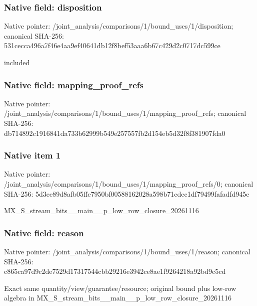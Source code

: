 \documentclass[10pt,a4paper]{article}
\begin{document}
\subsubsection{Native field: disposition}
Native pointer: /joint\_\allowbreak{}analysis/comparisons/1/bound\_\allowbreak{}uses/1/disposition; canonical SHA-256: 531cecca496a7f46e4aa9ef40641db12f8bef53aaa6b67c429d2c0717dc599ce

\begingroup\raggedright\sloppy included\par\endgroup

\subsubsection{Native field: mapping\_\allowbreak{}proof\_\allowbreak{}refs}
Native pointer: /joint\_\allowbreak{}analysis/comparisons/1/bound\_\allowbreak{}uses/1/mapping\_\allowbreak{}proof\_\allowbreak{}refs; canonical SHA-256: db714892c1916841da733b62999b549e257557fb2d154eb5d32f8f381907fda0

\subsubsection{Native item 1}
Native pointer: /joint\_\allowbreak{}analysis/comparisons/1/bound\_\allowbreak{}uses/1/mapping\_\allowbreak{}proof\_\allowbreak{}refs/0; canonical SHA-256: 5d3ee89d8afb05ffe7950bf00588162028a598b71cdec1df79499fafadfd945e

\begingroup\raggedright\sloppy MX\_\allowbreak{}S\_\allowbreak{}stream\_\allowbreak{}bits\_\allowbreak{}\_\allowbreak{}main\_\allowbreak{}\_\allowbreak{}p\_\allowbreak{}low\_\allowbreak{}row\_\allowbreak{}closure\_\allowbreak{}20261116\par\endgroup

\subsubsection{Native field: reason}
Native pointer: /joint\_\allowbreak{}analysis/comparisons/1/bound\_\allowbreak{}uses/1/reason; canonical SHA-256: c865ca97d9c2de7529d17317544cbb29216e3942ce8ae1f9264218a92bd9c5cd

\begingroup\raggedright\sloppy Exact same quantity/\allowbreak{}view/\allowbreak{}guarantee/\allowbreak{}resource;\allowbreak{} original bound plus low-row algebra in MX\_\allowbreak{}S\_\allowbreak{}stream\_\allowbreak{}bits\_\allowbreak{}\_\allowbreak{}main\_\allowbreak{}\_\allowbreak{}p\_\allowbreak{}low\_\allowbreak{}row\_\allowbreak{}closure\_\allowbreak{}20261116\par\endgroup
\end{document}
